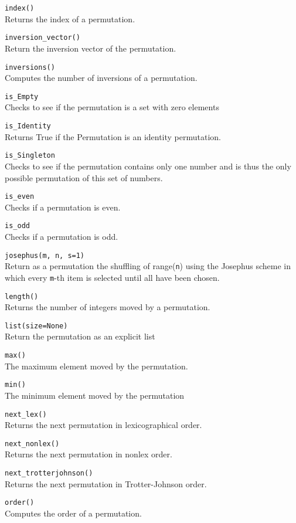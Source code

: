 \documentclass[10pt,landscape]{article}
\begin{document}
\begin{multicols}{3}
\verb!index()!\\
Returns the index of a permutation.


\verb!inversion_vector()!\\
Return the inversion vector of the permutation.


\verb!inversions()!\\
Computes the number of inversions of a permutation.


\verb!is_Empty!\\
Checks to see if the permutation is a set with zero elements


\verb!is_Identity!\\
Returns True if the Permutation is an identity permutation.


\verb!is_Singleton!\\
Checks to see if the permutation contains only one number and
 is thus the only possible permutation of this set of numbers.


 \verb!is_even!\\
Checks if a permutation is even.


\verb!is_odd!\\
Checks if a permutation is odd.


\verb!josephus(m, n, s=1)!\\
Return as a permutation the shuffling of range(\verb!n!) using the Josephus scheme
in which every \verb!m!-th item is selected until all have been chosen.


\verb!length()!\\
Returns the number of integers moved by a permutation.


\verb!list(size=None)!\\
Return the permutation as an explicit list


\verb!max()!\\
The maximum element moved by the permutation.


\verb!min()!\\
The minimum element moved by the permutation


\verb!next_lex()!\\
Returns the next permutation in lexicographical order.


\verb!next_nonlex()!\\
Returns the next permutation in nonlex order.


\verb!next_trotterjohnson()!\\
Returns the next permutation in Trotter-Johnson order.


\verb!order()!\\
Computes the order of a permutation.



\end{multicols}
\end{document}
